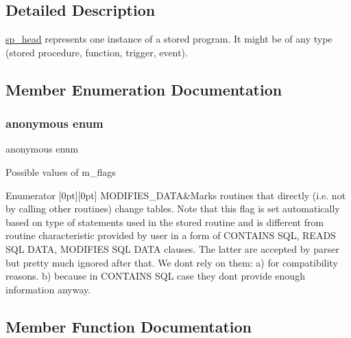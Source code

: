 \subsection{Detailed Description}
\mbox{\hyperlink{classsp__head}{sp\+\_\+head}} represents one instance of a stored program. It might be of any type (stored procedure, function, trigger, event). 

\subsection{Member Enumeration Documentation}
\mbox{\label{classsp__head_a2c493addd6f76d1338bfda5f5a587371}} 
\subsubsection{\texorpdfstring{anonymous enum}{anonymous enum}}
{\footnotesize\ttfamily anonymous enum}

Possible values of m\+\_\+flags \begin{DoxyEnumFields}{Enumerator}
[0pt][0pt]{}\mbox{\label{classsp__head_a2c493addd6f76d1338bfda5f5a587371a2b0e1fb757a290996d14136d2f75a931}} 
M\+O\+D\+I\+F\+I\+E\+S\+\_\+\+D\+A\+TA&Marks routines that directly (i.\+e. not by calling other routines) change tables. Note that this flag is set automatically based on type of statements used in the stored routine and is different from routine characteristic provided by user in a form of C\+O\+N\+T\+A\+I\+NS S\+QL, R\+E\+A\+DS S\+QL D\+A\+TA, M\+O\+D\+I\+F\+I\+ES S\+QL D\+A\+TA clauses. The latter are accepted by parser but pretty much ignored after that. We don\textquotesingle{}t rely on them\+: a) for compatibility reasons. b) because in C\+O\+N\+T\+A\+I\+NS S\+QL case they don\textquotesingle{}t provide enough information anyway. \\
\hline

\end{DoxyEnumFields}


\subsection{Member Function Documentation}
\mbox{\label{classsp__head_a10df6d89545f93d20ef4cb46e9c2599c}} 
